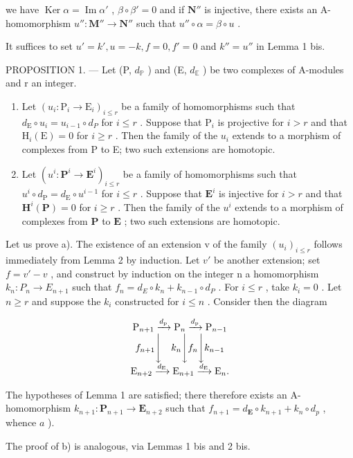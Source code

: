 we have \(\operatorname{Ker} \alpha = \operatorname{Im} \alpha'\) , \(\beta \circ \beta' = 0\) and if \(\mathbf{N}''\) is injective, there exists an A-homomorphism \(u'' : \mathbf{M}'' \to \mathbf{N}''\) such that \(u'' \circ \alpha = \beta \circ u\) .

It suffices to set \(u' = k', u = -k, f = 0, f' = 0\) and \(k'' = u''\) in Lemma 1 bis.

PROPOSITION 1. --- Let (P, \(d_{\mathbb{P}}\) ) and (E, \(d_{\mathbb{E}}\) ) be two complexes of A-modules and r an integer.

\begin{enumerate}
\def\labelenumi{\alph{enumi})}
\item
  Let \((u_i: \mathrm{P}_i \to \mathrm{E}_i)_{i \leqslant r}\) be a family of homomorphisms such that \(d_{\mathrm{E}} \circ u_i = u_{i-1} \circ d_P\) for \(i \leqslant r\) . Suppose that \(\mathrm{P}_i\) is projective for \(i > r\) and that \(\mathrm{H}_i(\mathrm{E}) = 0\) for \(i \geqslant r\) . Then the family of the \(u_i\) extends to a morphism of complexes from P to E; two such extensions are homotopic.
\item
  Let \((u^{i}:\mathbf{P}^{i}\to\mathbf{E}^{i})_{i\leqslant r}\) be a family of homomorphisms such that \(u^{i}\circ d_{\mathrm{P}}=d_{\mathrm{E}}\circ u^{i-1}\) for \(i\leqslant r\) . Suppose that \(\mathbf{E}^{i}\) is injective for \(i>r\) and that \(\mathbf{H}^{i}(\mathbf{P})=0\) for \(i\geqslant r\) . Then the family of the \(u^{i}\) extends to a morphism of complexes from \(\mathbf{P}\) to \(\mathbf{E}\) ; two such extensions are homotopic.
\end{enumerate}

Let us prove a). The existence of an extension v of the family \((u_{i})_{i\leqslant r}\) follows immediately from Lemma 2 by induction. Let \(v'\) be another extension; set \(f=v'-v\) , and construct by induction on the integer n a homomorphism \(k_{n}:P_{n}\to E_{n+1}\) such that \(f_{n}=d_{E}\circ k_{n}+k_{n-1}\circ d_{P}\) . For \(i\leqslant r\) , take \(k_{i}=0\) . Let \(n\geqslant r\) and suppose the \(k_{i}\) constructed for \(i\leqslant n\) . Consider then the diagram

\[
\begin{array}{c} \mathrm{P} _ {n + 1} \xrightarrow {d _ {\mathrm{p}}} \mathrm{P} _ {n} \xrightarrow {d _ {\mathrm{p}}} \mathrm{P} _ {n - 1} \\ f _ {n + 1} \Biggl \downarrow \quad k _ {n} \Biggl \downarrow f _ {n} \Biggl \downarrow k _ {n - 1} \\ \mathrm{E} _ {n + 2} \xrightarrow {d _ {\mathrm{E}}} \mathrm{E} _ {n + 1} \xrightarrow {d _ {\mathrm{E}}} \mathrm{E} _ {n}. \end{array}
\]

The hypotheses of Lemma 1 are satisfied; there therefore exists an A-homomorphism \(k_{n+1}: \mathbf{P}_{n+1} \to \mathbf{E}_{n+2}\) such that \(f_{n+1} = d_{\mathbf{E}} \circ k_{n+1} + k_n \circ d_p\) , whence \(a\) ).

The proof of b) is analogous, via Lemmas 1 bis and 2 bis.

